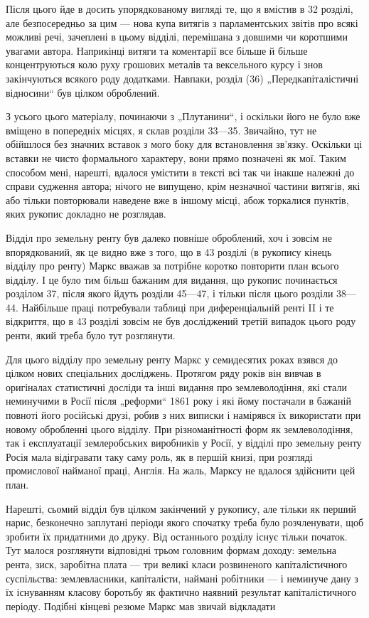 Після цього йде в досить упорядкованому вигляді те, що я
вмістив в 32 розділі, але безпосередньо за цим — нова купа витягів
з парламентських звітів про всякі можливі речі, зачеплені
в цьому відділі, перемішана з довшими чи коротшими увагами
автора. Наприкінці витяги та коментарії все більше й більше
концентруються коло руху грошових металів та вексельного
курсу і знов закінчуються всякого роду додатками. Навпаки, розділ
(36) „Передкапіталістичні відносини“ був цілком оброблений.

З усього цього матеріалу, починаючи з „Плутанини“, і оскільки
його не було вже вміщено в попередніх місцях, я склав
розділи 33—35. Звичайно, тут не обійшлося без значних вставок
з мого боку для встановлення зв’язку. Оскільки ці вставки
не чисто формального характеру, вони прямо позначені як мої.
Таким способом мені, нарешті, вдалося умістити в тексті всі так
чи інакше належні до справи судження автора; нічого не випущено,
крім незначної частини витягів, які або тільки повторювали
наведене вже в іншому місці, абож торкалися пунктів, яких
рукопис докладно не розглядав.

Відділ про земельну ренту був далеко повніше оброблений,
хоч і зовсім не впорядкований, як це видно вже з того, що
в 43 розділі (в рукопису кінець відділу про ренту) Маркс
вважав за потрібне коротко повторити план всього відділу. І це
було тим більш бажаним для видання, що рукопис починається
розділом 37, після якого йдуть розділи 45—47, і тільки після
цього розділи 38—44. Найбільше праці потребували таблиці
при диференціальній ренті II і те відкриття, що в 43 розділі
зовсім не був досліджений третій випадок цього роду ренти,
який треба було тут розглянути.

Для цього відділу про земельну ренту Маркс у семидесятих
роках взявся до цілком нових спеціальних досліджень. Протягом
ряду років він вивчав в оригіналах статистичні досліди
та інші видання про землеволодіння, які стали неминучими
в Росії після „реформи“ 1861 року і які йому постачали в бажаній
повноті його російські друзі, робив з них виписки і намірявся
їх використати при новому обробленні цього відділу. При
різноманітності форм як землеволодіння, так і експлуатації
землеробських виробників у Росії, у відділі про земельну ренту
Росія мала відігравати таку саму роль, як в першій книзі, при
розгляді промислової найманої праці, Англія. На жаль, Марксу
не вдалося здійснити цей план.

Нарешті, сьомий відділ був цілком закінчений у рукопису,
але тільки як перший нарис, безконечно заплутані періоди якого
спочатку треба було розчленувати, щоб зробити їх придатними
до друку. Від останнього розділу існує тільки початок. Тут
малося розглянути відповідні трьом головним формам доходу:
земельна рента, зиск, заробітна плата — три великі класи розвиненого
капіталістичного суспільства: землевласники, капіталісти,
наймані робітники — і неминуче дану з їх існуванням класову
боротьбу як фактично наявний результат капіталістичного
періоду. Подібні кінцеві резюме Маркс мав звичай відкладати
\parbreak{}  %
